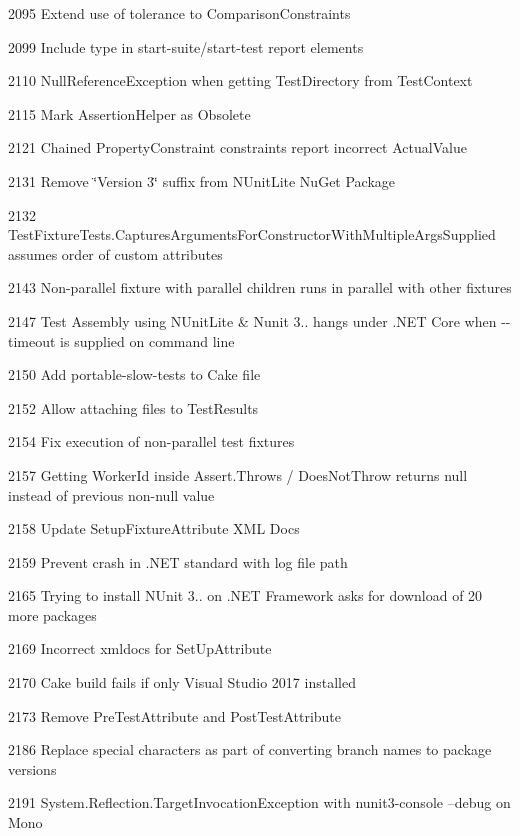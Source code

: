 \begin{DoxyItemize}
$$\item 2095 Extend use of tolerance to Comparison\+Constraints
\item 2099 Include type in start-\/suite/start-\/test report elements
\item 2110 Null\+Reference\+Exception when getting Test\+Directory from Test\+Context
\item 2115 Mark Assertion\+Helper as Obsolete
\item 2121 Chained Property\+Constraint constraints report incorrect Actual\+Value
\item 2131 Remove \char`\"{}\+Version 3\char`\"{} suffix from N\+Unit\+Lite Nu\+Get Package
\item 2132 Test\+Fixture\+Tests.\+Captures\+Arguments\+For\+Constructor\+With\+Multiple\+Args\+Supplied assumes order of custom attributes
\item 2143 Non-\/parallel fixture with parallel children runs in parallel with other fixtures
\item 2147 Test Assembly using N\+Unit\+Lite \& Nunit 3.. hangs under .N\+ET Core when {\ttfamily -\/-\/timeout} is supplied on command line
\item 2150 Add portable-\/slow-\/tests to Cake file
\item 2152 Allow attaching files to Test\+Results
\item 2154 Fix execution of non-\/parallel test fixtures
\item 2157 Getting Worker\+Id inside Assert.\+Throws / Does\+Not\+Throw returns null instead of previous non-\/null value
\item 2158 Update Setup\+Fixture\+Attribute X\+ML Docs
\item 2159 Prevent crash in .N\+ET standard with log file path
\item 2165 Trying to install N\+Unit 3.. on .N\+ET Framework asks for download of 20 more packages
\item 2169 Incorrect xmldocs for Set\+Up\+Attribute
\item 2170 Cake build fails if only Visual Studio 2017 installed
\item 2173 Remove Pre\+Test\+Attribute and Post\+Test\+Attribute
\item 2186 Replace special characters as part of converting branch names to package versions
\item 2191 System.\+Reflection.\+Target\+Invocation\+Exception with nunit3-\/console --debug on Mono
\end{DoxyItemize}

